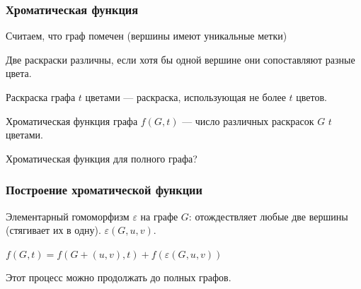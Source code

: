 \documentclass[xcolor=table]{beamer}
\begin{document}
\begin{frame} \frametitle{Хроматическая функция}
Считаем, что граф помечен (вершины имеют уникальные метки)
\begin{definition}
Две раскраски различны, если хотя бы одной вершине они сопоставляют разные цвета.
\end{definition}
\pause

\begin{definition}
Раскраска графа $t$ цветами --- раскраска, использующая не более $t$ цветов.
\end{definition}
\pause

\begin{definition}
Хроматическая функция графа $f(G,t)$ --- число различных раскрасок $G$ $t$ цветами.
\end{definition}
\pause
Хроматическая функция для полного графа?
\end{frame}


\begin{frame} \frametitle{Построение хроматической функции}

\begin{definition}
Элементарный гомоморфизм $\varepsilon$ на графе $G$: отождествляет любые две вершины (стягивает их в одну).
$\varepsilon(G,u,v)$.
\end{definition}
\pause

\begin{theorem}
$f(G,t) = f(G + (u,v), t) + f(\varepsilon(G,u,v))$
\end{theorem}
\pause
Этот процесс можно продолжать до полных графов. 

\end{frame}
\end{document}
